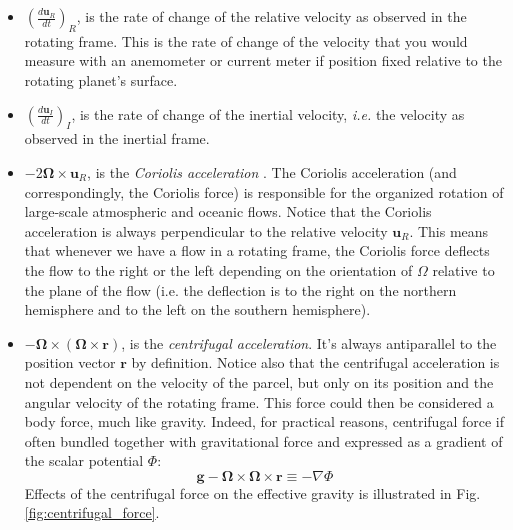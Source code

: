 \documentclass[12pt]{article}
\numberwithin{equation}{section}
\numberwithin{figure}{section}
\numberwithin{table}{section}
\begin{document}
\begin{itemize}
  \item $\left( \frac{d \mathbf{u}_R}{dt} \right)_R$, is the rate of change of
  the relative velocity as observed in the rotating frame.
  This is the rate of change of the velocity that you would measure with an
  anemometer or current meter if position fixed relative to the rotating planet's
  surface. 

  \item $\left( \frac{d \mathbf{u}_I}{dt} \right)_I$, is the rate of change of
  the inertial velocity, \textit{i.e.} the velocity as observed in the inertial
  frame.

  \item $-2 \mathbf{\Omega} \times \mathbf{u}_R$, is the
  \textit{Coriolis acceleration}
  .
  The Coriolis acceleration (and correspondingly, the Coriolis force) is
  responsible for the organized rotation of large-scale atmospheric and oceanic
  flows.
  Notice that the Coriolis acceleration is always perpendicular to the relative
  velocity $\mathbf{u}_R$.
  This means that whenever we have a flow in a rotating frame, the Coriolis
  force deflects the flow to the right or the left depending on the orientation
  of $\Omega$ relative to the plane of the flow (i.e. the deflection is to the
  right on the northern hemisphere and to the left on the southern hemisphere).

  \item $-\mathbf{\Omega} \times \left( \mathbf{\Omega} \times \mathbf{r} \right)$,
  is the \textit{centrifugal acceleration}.
  It's always antiparallel to the position vector $\mathbf{r}$ by definition.
  Notice also that the centrifugal acceleration is not dependent on the velocity
  of the parcel, but only on its position and the angular velocity of the
  rotating frame.
  This force could then be considered a body force, much like gravity.
  Indeed, for practical reasons, centrifugal force if often bundled together
  with gravitational force and expressed as a gradient of the scalar potential
  $\Phi$:
  \begin{equation}
    \mathbf{g} - \mathbf{\Omega} \times \mathbf{\Omega} \times \mathbf{r} \equiv - \nabla \Phi
  \end{equation}
  Effects of the centrifugal force on the effective gravity is illustrated
  in Fig. \ref{fig:centrifugal_force}.

\end{itemize}
\end{document}
